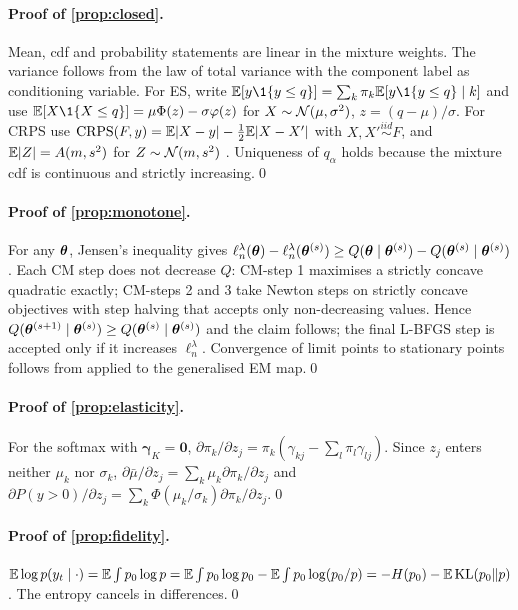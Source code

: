 \paragraph{Proof of \cref{prop:closed}.}
Mean, cdf and probability statements are linear in the mixture weights. The variance follows from
the law of total variance with the component label as conditioning variable. For ES, write
$\E[y\1\{y\le q\}]=\sum_k\pi_k\E[y\1\{y\le q\}\mid k]$ and use
$\E[X\1\{X\le q\}]=\mu\Phi(z)-\sigma\varphi(z)$ for $X\sim\mathcal{N}(\mu,\sigma^2)$, $z=(q-\mu)/\sigma$.
For CRPS use $\mathrm{CRPS}(F,y)=\mathbb{E}|X-y|-\tfrac12\mathbb{E}|X-X'|$ with $X,X'\stackrel{iid}{\sim}F$, and
$\mathbb{E}|Z|=A(m,s^2)$ for $Z\sim\mathcal{N}(m,s^2)$ \citep{grimit2006continuous}. Uniqueness of $q_\alpha$ holds
because the mixture cdf is continuous and strictly increasing.\qed

\paragraph{Proof of \cref{prop:monotone}.}
For any $\bm{\theta}$, Jensen's inequality gives
$\ell^\lambda_n(\bm{\theta})-\ell^\lambda_n(\bm{\theta}^{(s)})\ge Q(\bm{\theta}\mid\bm{\theta}^{(s)})-Q(\bm{\theta}^{(s)}\mid\bm{\theta}^{(s)})$
\citep{dempster1977maximum}. Each CM step does not decrease $Q$: CM-step 1 maximises a strictly
concave quadratic exactly; CM-steps 2 and 3 take Newton steps on strictly concave objectives with step
halving that accepts only non-decreasing values. Hence $Q(\bm{\theta}^{(s+1)}\mid\bm{\theta}^{(s)})\ge
Q(\bm{\theta}^{(s)}\mid\bm{\theta}^{(s)})$ and the claim follows; the final L-BFGS step is accepted only if it
increases $\ell^\lambda_n$. Convergence of limit points to stationary points follows from
\citet[Thm.~1]{wu1983convergence} applied to the generalised EM map.\qed

\paragraph{Proof of \cref{prop:elasticity}.}
For the softmax with $\bm\gamma_K=\bm0$,
$\partial\pi_k/\partial z_j=\pi_k(\gamma_{kj}-\sum_l\pi_l\gamma_{lj})$. Since $z_j$ enters neither
$\mu_k$ nor $\sigma_k$, $\partial\bar\mu/\partial z_j=\sum_k\mu_k\partial\pi_k/\partial z_j$ and
$\partial P(y>0)/\partial z_j=\sum_k\Phi(\mu_k/\sigma_k)\partial\pi_k/\partial z_j$.\qed

\paragraph{Proof of \cref{prop:fidelity}.}
$\mathbb{E}\log p(y_t\mid\cdot)=\mathbb{E}\int p_0\log p=\mathbb{E}\int p_0\log p_0-\mathbb{E}\int p_0\log(p_0/p)=-H(p_0)-\mathbb{E}\operatorname{KL}(p_0\|p)$.
The entropy cancels in differences.\qed

